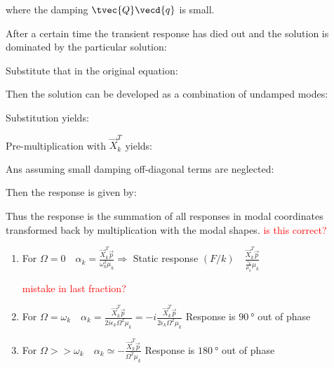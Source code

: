 \documentclass[10pt,a4paper]{scrartcl}
\begin{document}
\begin{multicols*}{2}

where the damping $\tvec{Q}\vecd{q}$ is small.

After a certain time the transient response has died out and the solution is dominated by the particular solution:


Substitute that in the original equation:


Then the solution can be developed as a combination of undamped modes:


Substitution yields:


Pre-multiplication with $\vec{X}_k^T$ yields:


Ans assuming small damping off-diagonal terms are neglected:


Then the response is given by:


Thus the response is the summation of all responses in modal coordinates transformed back by multiplication with the modal shapes. \textcolor{red}{is this correct?}

\vspace{3ex}

\begin{enumerate}
\item For $\Omega=0\quad\alpha_k=\frac{\vec{X}_k^T\vec{p}}{\omega_k^2\mu_k}\Rightarrow$ Static response $(F/k)\quad \frac{\vec{X}_k^T\vec{p}}{\frac{\gamma_k}{\mu_k}\mu_k}$

\textcolor{red}{mistake in last fraction?}

\item For $\Omega=\omega_k\quad\alpha_k=\frac{\vec{X}_k^T\vec{p}}{2i\epsilon_k\Omega^2\mu_k}=-i\frac{\vec{X}_k^T\vec{p}}{2\epsilon_k\Omega^2\mu_k}$ Response is $\SI{90}{\degree}$ out of phase
\item For $\Omega>>\omega_k\quad\alpha_k\simeq-\frac{\vec{X}_k^T\vec{p}}{\Omega^2\mu_k}$ Response is $\SI{180}{\degree}$ out of phase
\end{enumerate}


\end{multicols*}
\end{document}
